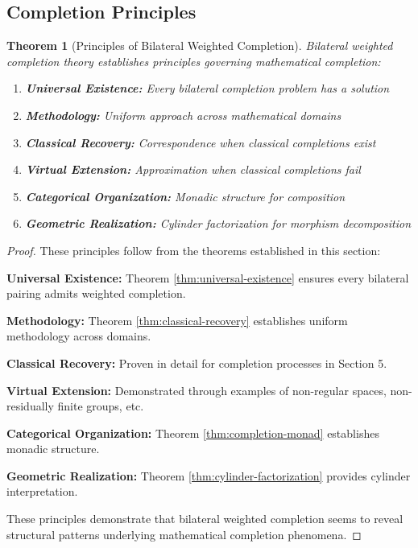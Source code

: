 \documentclass[11pt]{article}
\theoremstyle{plain}
\newtheorem{theorem}{Theorem}[section]
\theoremstyle{definition}
\theoremstyle{remark}
\begin{document}
\subsection{Completion Principles}

\begin{theorem}[Principles of Bilateral Weighted Completion]\label{thm:universal-principles}
Bilateral weighted completion theory establishes principles governing mathematical completion:

\begin{enumerate}
\item \textbf{Universal Existence:} Every bilateral completion problem has a solution
\item \textbf{Methodology:} Uniform approach across mathematical domains  
\item \textbf{Classical Recovery:} Correspondence when classical completions exist
\item \textbf{Virtual Extension:} Approximation when classical completions fail
\item \textbf{Categorical Organization:} Monadic structure for composition
\item \textbf{Geometric Realization:} Cylinder factorization for morphism decomposition
\end{enumerate}
\end{theorem}

\begin{proof}
These principles follow from the theorems established in this section:

\textbf{Universal Existence:} Theorem \ref{thm:universal-existence} ensures every bilateral pairing admits weighted completion.

\textbf{Methodology:} Theorem \ref{thm:classical-recovery} establishes uniform methodology across domains.

\textbf{Classical Recovery:} Proven in detail for completion processes in Section 5.

\textbf{Virtual Extension:} Demonstrated through examples of non-regular spaces, non-residually finite groups, etc.

\textbf{Categorical Organization:} Theorem \ref{thm:completion-monad} establishes monadic structure.

\textbf{Geometric Realization:} Theorem \ref{thm:cylinder-factorization} provides cylinder interpretation.

These principles demonstrate that bilateral weighted completion seems to reveal structural patterns underlying mathematical completion phenomena.
\end{proof}
\end{document}
